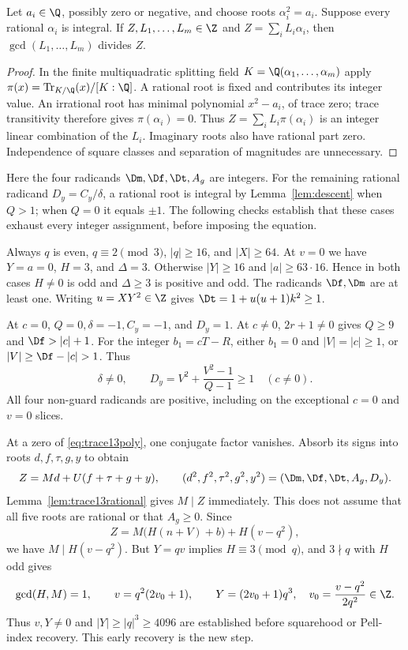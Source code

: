 \begin{lemma}\label{lem:trace13rational}
Let $a_i\in\Q$, possibly zero or negative, and choose roots
$\alpha_i^2=a_i$. Suppose every rational $\alpha_i$ is integral.
If $Z,L_1,\ldots,L_m\in\Z$ and
$Z=\sum_iL_i\alpha_i$, then $\gcd(L_1,\ldots,L_m)$ divides $Z$.
\end{lemma}
\begin{proof}
In the finite multiquadratic splitting field
$K=\Q(\alpha_1,\ldots,\alpha_m)$ apply
$\pi(x)=\operatorname{Tr}_{K/\Q}(x)/[K:\Q]$.
A rational root is fixed and contributes its integer value. An
irrational root has minimal polynomial $x^2-a_i$, of trace zero;
trace transitivity therefore gives $\pi(\alpha_i)=0$. Thus
$Z=\sum_iL_i\pi(\alpha_i)$ is an integer linear combination of the
$L_i$. Imaginary roots also have rational part zero. Independence of
square classes and separation of magnitudes are unnecessary.
\end{proof}

Here the four radicands $\Dm,\Df,\Dt,A_g$ are integers. For the
remaining rational radicand $D_y=C_y/\delta$, a rational root is
integral by Lemma~\ref{lem:descent} when $Q>1$; when $Q=0$ it equals
$\pm1$. The following checks establish that these cases exhaust every
integer assignment, before imposing the equation.

Always $q$ is even, $q\equiv2\pmod3$, $|q|\ge16$, and
$|X|\ge64$. At $v=0$ we have $Y=a=0$, $H=3$, and $\Delta=3$.
Otherwise $|Y|\ge16$ and $|a|\ge63\cdot16$. Hence in both cases
$H\ne0$ is odd and $\Delta\ge3$ is positive and odd. The radicands
$\Df,\Dm$ are at least one. Writing $u=XY^2\in\Z$ gives
$\Dt=1+u(u+1)k^2\ge1$.

At $c=0$, $Q=0,\delta=-1,C_y=-1$, and $D_y=1$. At $c\ne0$,
$2r+1\ne0$ gives $Q\ge9$ and $\Df>|c|+1$. For the integer
$b_1=cT-R$, either $b_1=0$ and $|V|=|c|\ge1$, or
$|V|\ge\Df-|c|>1$. Thus
\begin{equation}
 \delta\ne0,\qquad
 D_y=V^2+\frac{V^2-1}{Q-1}\ge1\quad(c\ne0).
 \label{eq:trace13realness}
\end{equation}
All four non-guard radicands are positive, including on the exceptional
$c=0$ and $v=0$ slices.

At a zero of \eqref{eq:trace13poly}, one conjugate factor vanishes.
Absorb its signs into roots $d,f,\tau,g,y$ to obtain
\begin{equation}
 Z=Md+U(f+\tau+g+y),\qquad
 (d^2,f^2,\tau^2,g^2,y^2)=(\Dm,\Df,\Dt,A_g,D_y).
 \label{eq:trace13factor}
\end{equation}
Lemma~\ref{lem:trace13rational} gives $M\mid Z$ immediately. This
does not assume that all five roots are rational or that $A_g\ge0$.
Since
\[
 Z=M\bigl(H(n+V)+b\bigr)+H(v-q^2),
\]
we have $M\mid H(v-q^2)$. But $Y=qv$ implies
$H\equiv3\pmod q$, and $3\nmid q$ with $H$ odd gives
\begin{equation}
 \gcd(H,M)=1,\qquad
 v=q^2(2v_0+1),\qquad
 Y=(2v_0+1)q^3,\quad
 v_0=\frac{v-q^2}{2q^2}\in\Z.
 \label{eq:trace13scale}
\end{equation}
Thus $v,Y\ne0$ and $|Y|\ge|q|^3\ge4096$ are established before
squarehood or Pell-index recovery. This early recovery is the new step.

